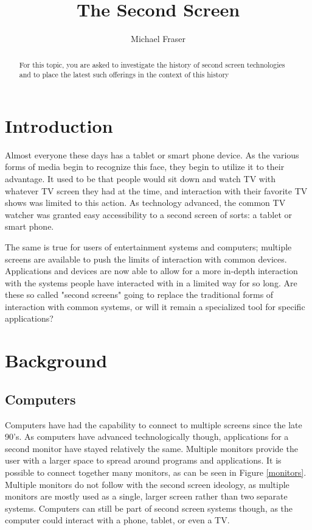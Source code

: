 \documentclass[11pt, oneside]{article}
\begin{document}
\title{The Second Screen}
\author{Michael Fraser}
\maketitle

\begin{abstract}
For this topic, 
you are asked to investigate the history of second 
screen technologies and to place the latest such 
offerings in the context of this history
\end{abstract}

\tableofcontents

\section{Introduction}
Almost everyone these days has a tablet or smart phone device. As the various forms of media begin to recognize this face, they begin to utilize it to their advantage. It used to be that people would sit down and watch TV with whatever TV screen they had at the time, and interaction with their favorite TV shows was limited to this action. As technology advanced, the common TV watcher was granted easy accessibility to a second screen of sorts: a tablet or smart phone. 

The same is true for users of entertainment systems and computers; multiple screens are available to push the limits of interaction with common devices. Applications and devices are now able to allow for a more in-depth interaction with the systems people have interacted with in a limited way for so long. Are these so called "second screens" going to replace the traditional forms of interaction with common systems, or will it remain a specialized tool for specific applications?

\section{Background}

\subsection{Computers}
Computers have had the capability to connect to multiple screens since the late 90's. As computers have advanced technologically though, applications for a second monitor have stayed relatively the same. Multiple monitors provide the user with a larger space to spread around programs and applications. It is possible to connect together many monitors, as can be seen in Figure \ref{monitors}. Multiple monitors do not follow with the second screen ideology, as multiple monitors are mostly used as a single, larger screen rather than two separate systems. Computers can still be part of second screen systems though, as the computer could interact with a phone, tablet, or even a TV. 
\end{document}
